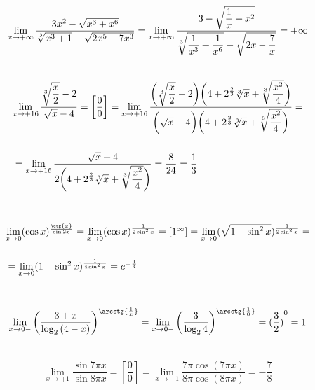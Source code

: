\documentclass[12pt]{article}
\begin{document}
	\\
	$$
	\begin{array}{l}
		\lim\limits_{x\rightarrow+\infty} \dfrac{3x^2-\sqrt{x^3+x^6}}{\sqrt[3]{x^3+1}-\sqrt{2x^5-7x^3}}=\lim\limits_{x\rightarrow+\infty} \dfrac{3-\sqrt{\dfrac{1}{x}+x^2}}{\sqrt[3]{\dfrac{1}{x^3}+\dfrac{1}{x^6}}-\sqrt{2x-\dfrac{7}{x}}}=+\infty
		\\ \medskip{}{}
	\end{array}
	$$
	$$
	\begin{array}{l} 
		\lim\limits_{x\rightarrow+16} \dfrac{\sqrt[3]{\dfrac{x}{2}}-2}{\sqrt{x}-4} = \left[\dfrac{0}{0} \right]= \lim\limits_{x\rightarrow+16} \dfrac{\bigg(\sqrt[3]{\dfrac{x}{2}}-2 \bigg) \bigg(4+2^{\frac{2}{3}} \sqrt[3]{x}+\sqrt[3]{\dfrac{x^2}{4}}\bigg)}{\bigg(\sqrt{x}-4 \bigg) \bigg (4+2^{\frac{2}{3}} \sqrt[3]{x}+\sqrt[3]{\dfrac{x^2}{4}}\bigg )}=\\ \medskip{}{} \\ \medskip{}{} = \lim\limits_{x\rightarrow+16} \dfrac{\sqrt{x}+4}{2 \bigg (4+2^{\frac{2}{3}} \sqrt[3]{x}+\sqrt[3]{\dfrac{x^2}{4}} \bigg )}=\dfrac{8}{24}=\dfrac{1}{3}
	\end{array}
	$$
	\\
	$$
	\begin{array}{l}
		\lim\limits_{x\rightarrow0} (\cos{x})^{\frac{\ctg{x}}{\sin{2x}}}=\lim\limits_{x\rightarrow0} (\cos{x})^{\frac{1}{2\sin^2{x}}}=\left[1^{\infty}\right]=\lim\limits_{x\rightarrow0} (\sqrt{1-\sin^2{x}})^{\frac{1}{2\sin^2{x}}}=\\ \medskip{}{} \\ \medskip{}{}= \lim\limits_{x\rightarrow0} ({1-\sin^2{x}})^{\frac{1}{4\sin^2{x}}}=e^{-\frac{1}{4}}
	\end{array}
	$$
	\\
	$$
	\begin{array}{l}
		\lim\limits_{x\rightarrow0-} \left(\dfrac{3+x}{\log_2 {(4-x)}}\right)^{\arcctg{\frac{1}{x}}}= \lim\limits_{x\rightarrow0-} \left(\dfrac{3}{\log_2 {4}}\right)^{\arcctg{\frac{1}{0}}}= {(\dfrac{3}{2})}^{0}=1
		\\ \medskip{}{}
	\end{array}
	$$
	$$
	\begin{array}{l}
		\lim\limits_{x\rightarrow+1} \dfrac{\sin{7 \pi x}}{\sin{8 \pi x}}=\left[\dfrac{0}{0} \right]=\lim\limits_{x\rightarrow+1} \dfrac{7 \pi \cos{(7 \pi x)}}{8 \pi \cos{(8 \pi x)}}=-\dfrac{7}{8}
	\end{array}
	$$
\end{document}

